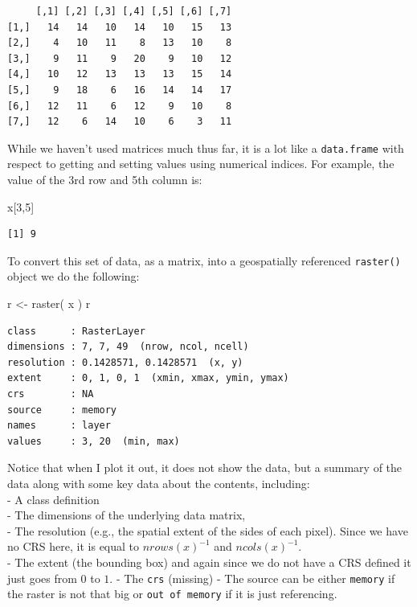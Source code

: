 \documentclass[
  letterpaper,
]{book}
\newenvironment{Shaded}{\begin{snugshade}}{\end{snugshade}}
\newcommand{\DecValTok}[1]{\textcolor[rgb]{0.68,0.00,0.00}{#1}}
\newcommand{\FunctionTok}[1]{\textcolor[rgb]{0.28,0.35,0.67}{#1}}
\newcommand{\NormalTok}[1]{\textcolor[rgb]{0.00,0.23,0.31}{#1}}
\newcommand{\OtherTok}[1]{\textcolor[rgb]{0.00,0.23,0.31}{#1}}
\begin{document}
\begin{verbatim}
     [,1] [,2] [,3] [,4] [,5] [,6] [,7]
[1,]   14   14   10   14   10   15   13
[2,]    4   10   11    8   13   10    8
[3,]    9   11    9   20    9   10   12
[4,]   10   12   13   13   13   15   14
[5,]    9   18    6   16   14   14   17
[6,]   12   11    6   12    9   10    8
[7,]   12    6   14   10    6    3   11
\end{verbatim}

While we haven't used matrices much thus far, it is a lot like a
\texttt{data.frame} with respect to getting and setting values using
numerical indices. For example, the value of the 3rd row and 5th column
is:

\begin{Shaded}
\begin{Highlighting}[]
\NormalTok{x[}\DecValTok{3}\NormalTok{,}\DecValTok{5}\NormalTok{]}
\end{Highlighting}
\end{Shaded}

\begin{verbatim}
[1] 9
\end{verbatim}

To convert this set of data, as a matrix, into a geospatially referenced
\texttt{raster()} object we do the following:

\begin{Shaded}
\begin{Highlighting}[]
\NormalTok{r }\OtherTok{\textless{}{-}} \FunctionTok{raster}\NormalTok{( x )}
\NormalTok{r}
\end{Highlighting}
\end{Shaded}

\begin{verbatim}
class      : RasterLayer 
dimensions : 7, 7, 49  (nrow, ncol, ncell)
resolution : 0.1428571, 0.1428571  (x, y)
extent     : 0, 1, 0, 1  (xmin, xmax, ymin, ymax)
crs        : NA 
source     : memory
names      : layer 
values     : 3, 20  (min, max)
\end{verbatim}

Notice that when I plot it out, it does not show the data, but a summary
of the data along with some key data about the contents, including:\\
- A class definition\\
- The dimensions of the underlying data matrix,\\
- The resolution (e.g., the spatial extent of the sides of each pixel).
Since we have no CRS here, it is equal to \(nrows(x)^{-1}\) and
\(ncols(x)^{-1}\).\\
- The extent (the bounding box) and again since we do not have a CRS
defined it just goes from \(0\) to \(1\). - The \texttt{crs} (missing) -
The source can be either \texttt{memory} if the raster is not that big
or \texttt{out\ of\ memory} if it is just referencing.
\end{document}
